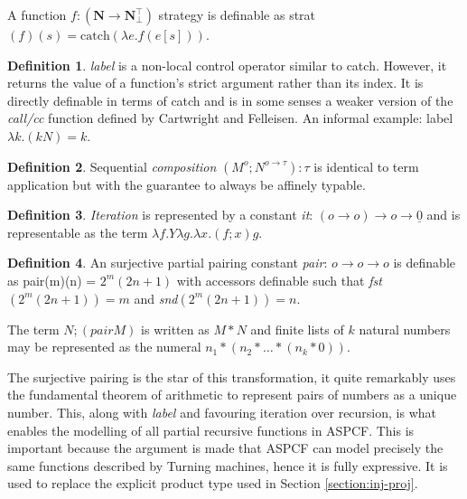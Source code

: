 \documentclass[12pt,a4paper]{report}
\theoremstyle{definition}
\newtheorem{definition}{Definition}[chapter]%
\theoremstyle{remark}
\begin{document}
A function $f : (\textbf{N} \rightarrow \textbf{N}_\bot^\top)$ strategy is definable as strat$(f)(s) = \text{catch}(\lambda e.f(e[s]))$.

\begin{definition}
    \emph{label} is a non-local control operator similar to catch. However, it returns the value of a function's strict argument rather than its index. It is directly definable in terms of catch and is in some senses a weaker version of the \emph{call/cc} function defined by Cartwright and Felleisen. An informal example: label $\lambda k.(k N) = k$.
\end{definition}
\begin{definition}
    Sequential \emph{composition} $(M^o; N^{o \rightarrow \tau}): \tau$ is identical to term application but with the guarantee to always be affinely typable.
\end{definition}
\begin{definition}
    \emph{Iteration} is represented by a constant \emph{it}: $(o \rightarrow o) \rightarrow o \rightarrow \underline{0}$ and is representable as the term $\lambda f. Y \lambda g. \lambda x. (f;x)g$.
\end{definition}
\begin{definition}
    An surjective partial pairing constant \emph{pair}: $o \rightarrow o \rightarrow o$ is definable as pair(m)(n) = $2^m(2n + 1)$ with accessors definable such that \emph{fst}$(2^m(2n + 1)) = m$ and \emph{snd}$(2^m(2n + 1)) = n$.

    The term $N; (pair M)$ is written as $M * N$ and finite lists of $k$ natural numbers may be represented as the numeral $n_1 * (n_2 * \dots * (n_k * 0))$.
\end{definition}

The surjective pairing is the star of this transformation, it quite remarkably uses the fundamental theorem of arithmetic to represent pairs of numbers as a unique number. This, along with \emph{label} and favouring iteration over recursion, is what enables the modelling of all partial recursive functions in ASPCF. This is important because the argument is made that ASPCF can model precisely the same functions described by Turning machines, hence it is fully expressive. It is used to replace the explicit product type used in Section \ref{section:inj-proj}.
\end{document}
